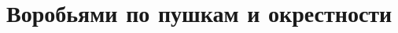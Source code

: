

\section*{Воробьями по пушкам и окрестности}






\begingroup
\providecommand{\ifgroupten}{\iftrue}
\providecommand{\ifgroupeleven}{\iftrue}

